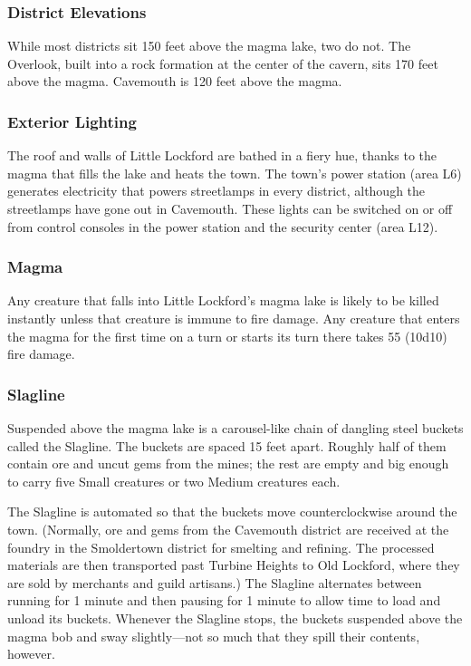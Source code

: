 \documentclass[10pt,a4paper,twoside,bg=print,twocolumn,openany,nodeprecatedcode]{dndbook}
\begin{document}
\subsubsection{District Elevations}
While most districts sit 150 feet above the magma lake, two do not. The Overlook, built into a rock formation at the center of the cavern, sits 170 feet above the magma. Cavemouth is 120 feet above the magma.

\subsubsection{Exterior Lighting}
The roof and walls of Little Lockford are bathed in a fiery hue, thanks to the magma that fills the lake and heats the town. The town's power station (area L6) generates electricity that powers streetlamps in every district, although the streetlamps have gone out in Cavemouth. These lights can be switched on or off from control consoles in the power station and the security center (area L12).

\subsubsection{Magma}
Any creature that falls into Little Lockford's magma lake is likely to be killed instantly unless that creature is immune to fire damage. Any creature that enters the magma for the first time on a turn or starts its turn there takes 55 (10d10) fire damage.

\subsubsection{Slagline}
Suspended above the magma lake is a carousel-like chain of dangling steel buckets called the Slagline. The buckets are spaced 15 feet apart. Roughly half of them contain ore and uncut gems from the mines; the rest are empty and big enough to carry five Small creatures or two Medium creatures each.

The Slagline is automated so that the buckets move counterclockwise around the town. (Normally, ore and gems from the Cavemouth district are received at the foundry in the Smoldertown district for smelting and refining. The processed materials are then transported past Turbine Heights to Old Lockford, where they are sold by merchants and guild artisans.) The Slagline alternates between running for 1 minute and then pausing for 1 minute to allow time to load and unload its buckets. Whenever the Slagline stops, the buckets suspended above the magma bob and sway slightly—not so much that they spill their contents, however.
\end{document}
